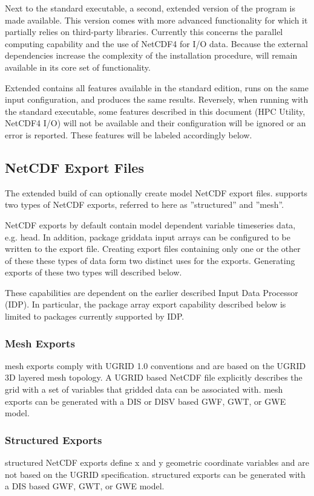 Next to the standard \mf executable, a second, extended version of the program is made available. This version comes with more advanced functionality for which it partially relies on third-party libraries. Currently this concerns the parallel computing capability and the use of NetCDF4 for I/O data. Because the external dependencies increase the complexity of the installation procedure, \mf will remain available in its core set of functionality.

Extended \mf contains all features available in the standard edition, runs on the same input configuration, and produces the same results. Reversely, when running with the standard executable, some features described in this document (HPC Utility, NetCDF4 I/O) will not be available and their configuration will be ignored or an error is reported. These features will be labeled accordingly below.

\subsection{NetCDF Export Files}

The extended build of \mf can optionally create model NetCDF export files.  \mf supports two types of NetCDF exports, referred to here as ''structured'' and ''mesh''.

\mf NetCDF exports by default contain model dependent variable timeseries data, e.g. head.  In addition, \mf package griddata input arrays can be configured to be written to the export file.  Creating export files containing only one or the other of these these types of data form two distinct uses for the exports.  Generating exports of these two types will described below.

These capabilities are dependent on the earlier described Input Data Processor (IDP).  In particular, the package array export capability described below is limited to packages currently supported by IDP.

\subsubsection{Mesh Exports}
\mf mesh exports comply with UGRID 1.0 conventions and are based on the UGRID 3D layered mesh topology.  A UGRID based NetCDF file explicitly describes the grid with a set of variables that gridded data can be associated with.  \mf mesh exports can be generated with a DIS or DISV based GWF, GWT, or GWE model.

\subsubsection{Structured Exports}
\mf structured NetCDF exports define x and y geometric coordinate variables and are not based on the UGRID specification.  \mf structured exports can be generated with a DIS based GWF, GWT, or GWE model.

